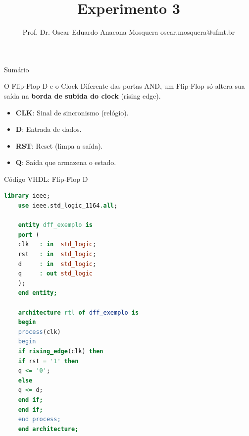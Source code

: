 \documentclass[aspectratio=169]{beamer}
\title[Arquitetura de Computadores]{\huge  Experimento 3} %
\author[Prof. Dr. Oscar Eduardo Anacona Mosquera]{Prof. Dr. Oscar Eduardo Anacona Mosquera \newline\newline 
	\scriptsize{oscar.mosquera@ufmt.br}
}%
\begin{document}
	\begin{frame}[plain]
		\titlepage
	\end{frame}
	
	\begin{frame}{Sumário}
		\tableofcontents
	\end{frame}
	







\begin{frame}{O Flip-Flop D e o Clock}
	\justifying
	Diferente das portas AND, um Flip-Flop só altera sua saída na \textbf{borda de subida do clock} (rising edge).
	
	\begin{itemize}
		\item \textbf{CLK}: Sinal de sincronismo (relógio).
		\item \textbf{D}: Entrada de dados.
		\item \textbf{RST}: Reset (limpa a saída).
		\item \textbf{Q}: Saída que armazena o estado.
	\end{itemize}
	
	\end{frame}
	
	\begin{frame}[fragile]{Código VHDL: Flip-Flop D}
\begin{lstlisting}[language=VHDL, basicstyle=\tiny]
	library ieee;
	use ieee.std_logic_1164.all;
	
	entity dff_exemplo is
	port (
	clk   : in  std_logic;
	rst   : in  std_logic;
	d     : in  std_logic;
	q     : out std_logic
	);
	end entity;
	
	architecture rtl of dff_exemplo is
	begin
	process(clk)
	begin
	if rising_edge(clk) then
	if rst = '1' then
	q <= '0';
	else
	q <= d;
	end if;
	end if;
	end process;
	end architecture;
\end{lstlisting}
\end{frame}
\end{document}
